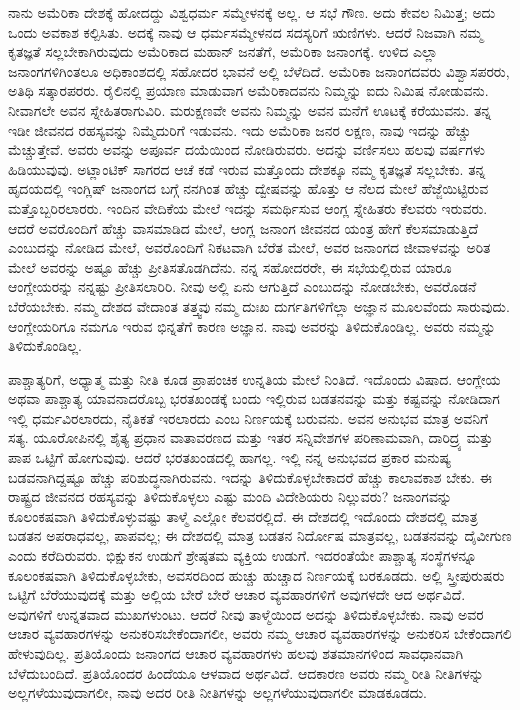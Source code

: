 ನಾನು ಅಮೆರಿಕಾ ದೇಶಕ್ಕೆ ಹೋದದ್ದು ವಿಶ್ವಧರ್ಮ ಸಮ್ಮೇಳನಕ್ಕೆ ಅಲ್ಲ. ಆ ಸಭೆ ಗೌಣ. ಅದು ಕೇವಲ ನಿಮಿತ್ತ; ಅದು ಒಂದು ಅವಕಾಶ ಕಲ್ಪಿಸಿತು. ಅದಕ್ಕೆ ನಾವು ಆ ಧರ್ಮಸಮ್ಮೇಳನದ ಸದಸ್ಯರಿಗೆ ಋಣಿಗಳು. ಆದರೆ ನಿಜವಾಗಿ ನಮ್ಮ ಕೃತಜ್ಞತೆ ಸಲ್ಲಬೇಕಾಗಿರುವುದು ಅಮೆರಿಕಾದ ಮಹಾನ್​ ಜನತೆಗೆ, ಅಮೆರಿಕಾ ಜನಾಂಗಕ್ಕೆ. ಉಳಿದ ಎಲ್ಲಾ ಜನಾಂಗಗಳಿಗಿಂತಲೂ ಅಧಿಕಾಂಶದಲ್ಲಿ ಸಹೋದರ ಭಾವನೆ ಅಲ್ಲಿ ಬೆಳೆದಿದೆ. ಅಮೆರಿಕಾ ಜನಾಂಗದವರು ವಿಶ್ವಾಸಪರರು, ಅತಿಥಿ ಸತ್ಕಾರಪರರು. ರೈಲಿನಲ್ಲಿ ಪ್ರಯಾಣ ಮಾಡುವಾಗ ಅಮೆರಿಕಾದವನು ನಿಮ್ಮನ್ನು ಐದು ನಿಮಿಷ ನೋಡುವನು. ನೀವಾಗಲೇ ಅವನ ಸ್ನೇಹಿತರಾಗುವಿರಿ. ಮರುಕ್ಷಣವೇ ಅವನು ನಿಮ್ಮನ್ನು ಅವನ ಮನೆಗೆ ಊಟಕ್ಕೆ ಕರೆಯುವನು. ತನ್ನ ಇಡೀ ಜೀವನದ ರಹಸ್ಯವನ್ನು ನಿಮ್ಮೆದುರಿಗೆ ಇಡುವನು. ಇದು ಅಮೆರಿಕಾ ಜನರ ಲಕ್ಷಣ, ನಾವು ಇದನ್ನು ಹೆಚ್ಚು ಮೆಚ್ಚುತ್ತೇವೆ. ಅವರು ಅವನ್ನು ಅಪೂರ್ವ ದಯೆಯಿಂದ ನೋಡಿರುವರು. ಅದನ್ನು ವರ್ಣಿಸಲು ಹಲವು ವರ್ಷಗಳು ಹಿಡಿಯುವುವು. ಅಟ್ಲಾಂಟಿಕ್​ ಸಾಗರದ ಆಚೆ ಕಡೆ ಇರುವ ಮತ್ತೊಂದು ದೇಶಕ್ಕೂ ನಮ್ಮ ಕೃತಜ್ಞತೆ ಸಲ್ಲಬೇಕು. ತನ್ನ ಹೃದಯದಲ್ಲಿ ಇಂಗ್ಲಿಷ್​ ಜನಾಂಗದ ಬಗ್ಗೆ ನನಗಿಂತ ಹೆಚ್ಚು ದ್ವೇಷವನ್ನು ಹೊತ್ತು ಆ ನೆಲದ ಮೇಲೆ ಹೆಜ್ಜೆಯಿಟ್ಟಿರುವ ಮತ್ತೊಬ್ಬರಿರಲಾರರು. ಇಂದಿನ ವೇದಿಕೆಯ ಮೇಲೆ ಇದನ್ನು ಸಮರ್ಥಿಸುವ ಆಂಗ್ಲ ಸ್ನೇಹಿತರು ಕೆಲವರು ಇರುವರು. ಆದರೆ ಅವರೊಂದಿಗೆ ಹೆಚ್ಚು ವಾಸಮಾಡಿದ ಮೇಲೆ, ಆಂಗ್ಲ ಜನಾಂಗ ಜೀವನದ ಯಂತ್ರ ಹೇಗೆ ಕೆಲಸಮಾಡುತ್ತಿದೆ ಎಂಬುದನ್ನು ನೋಡಿದ ಮೇಲೆ, ಅವರೊಂದಿಗೆ ನಿಕಟವಾಗಿ ಬೆರೆತ ಮೇಲೆ, ಅವರ ಜನಾಂಗದ ಜೀವಾಳವನ್ನು ಅರಿತ ಮೇಲೆ ಅವರನ್ನು ಅಷ್ಟೂ ಹೆಚ್ಚು ಪ್ರೀತಿಸತೊಡಗಿದೆನು. ನನ್ನ ಸಹೋದರರೇ, ಈ ಸಭೆಯಲ್ಲಿರುವ ಯಾರೂ ಆಂಗ್ಲೇಯರನ್ನು ನನ್ನಷ್ಟು ಪ್ರೀತಿಸಲಾರಿರಿ. ನೀವು ಅಲ್ಲಿ ಏನು ಆಗುತ್ತಿದೆ ಎಂಬುದನ್ನು ನೋಡಬೇಕು, ಅವರೊಡನೆ ಬೆರೆಯಬೇಕು. ನಮ್ಮ ದೇಶದ ವೇದಾಂತ ತತ್ತ್ವವು ನಮ್ಮ ದುಃಖ ದುರ್ಗತಿಗಳಿಗೆಲ್ಲಾ ಅಜ್ಞಾನ ಮೂಲವೆಂದು ಸಾರುವುದು. ಆಂಗ್ಲೇಯರಿಗೂ ನಮಗೂ ಇರುವ ಭಿನ್ನತೆಗೆ ಕಾರಣ ಅಜ್ಞಾನ. ನಾವು ಅವರನ್ನು ತಿಳಿದುಕೊಂಡಿಲ್ಲ. ಅವರು ನಮ್ಮನ್ನು ತಿಳಿದುಕೊಂಡಿಲ್ಲ.

ಪಾಶ್ಚಾತ್ಯರಿಗೆ, ಅಧ್ಯಾತ್ಮ ಮತ್ತು ನೀತಿ ಕೂಡ ಪ್ರಾಪಂಚಿಕ ಉನ್ನತಿಯ ಮೇಲೆ ನಿಂತಿದೆ. ಇದೊಂದು ವಿಷಾದ. ಆಂಗ್ಲೇಯ ಅಥವಾ ಪಾಶ್ಚಾತ್ಯ ಯಾವನಾದರೊಬ್ಬ ಭರತಖಂಡಕ್ಕೆ ಬಂದು ಇಲ್ಲಿರುವ ಬಡತನವನ್ನು ಮತ್ತು ಕಷ್ಟವನ್ನು ನೋಡಿದಾಗ ಇಲ್ಲಿ ಧರ್ಮವಿರಲಾರದು, ನೈತಿಕತೆ ಇರಲಾರದು ಎಂಬ ನಿರ್ಣಯಕ್ಕೆ ಬರುವನು. ಅವನ ಅನುಭವ ಮಾತ್ರ ಅವನಿಗೆ ಸತ್ಯ. ಯೂರೋಪಿನಲ್ಲಿ ಶೈತ್ಯ ಪ್ರಧಾನ ವಾತಾವರಣದ ಮತ್ತು ಇತರ ಸನ್ನಿವೇಶಗಳ ಪರಿಣಾಮವಾಗಿ, ದಾರಿದ್ರ್ಯ ಮತ್ತು ಪಾಪ ಒಟ್ಟಿಗೆ ಹೋಗುವುವು. ಆದರೆ ಭರತಖಂಡದಲ್ಲಿ ಹಾಗಲ್ಲ. ಇಲ್ಲಿ ನನ್ನ ಅನುಭವದ ಪ್ರಕಾರ ಮನುಷ್ಯ ಬಡವನಾಗಿದ್ದಷ್ಟೂ ಹೆಚ್ಚು ಪರಿಶುದ್ಧನಾಗಿರುವನು. ಇದನ್ನು ತಿಳಿದುಕೊಳ್ಳಬೇಕಾದರೆ ಹೆಚ್ಚು ಕಾಲಾವಕಾಶ ಬೇಕು. ಈ ರಾಷ್ಟ್ರದ ಜೀವನದ ರಹಸ್ಯವನ್ನು ತಿಳಿದುಕೊಳ್ಳಲು ಎಷ್ಟು ಮಂದಿ ವಿದೇಶಿಯರು ನಿಲ್ಲುವರು? ಜನಾಂಗವನ್ನು ಕೂಲಂಕಷವಾಗಿ ತಿಳಿದುಕೊಳ್ಳುವಷ್ಟು ತಾಳ್ಮೆ ಎಲ್ಲೋ ಕೆಲವರಲ್ಲಿದೆ. ಈ ದೇಶದಲ್ಲಿ ಇದೊಂದು ದೇಶದಲ್ಲಿ ಮಾತ್ರ ಬಡತನ ಅಪರಾಧವಲ್ಲ, ಪಾಪವಲ್ಲ; ಈ ದೇಶದಲ್ಲಿ ಮಾತ್ರ ಬಡತನ ನಿರ್ದೋಷ ಮಾತ್ರವಲ್ಲ, ಬಡತನವನ್ನು ದೈವೀಗುಣ ಎಂದು ಕರೆದಿರುವರು. ಭಿಕ್ಷುಕನ ಉಡುಗೆ ಶ್ರೇಷ್ಠತಮ ವ್ಯಕ್ತಿಯ ಉಡುಗೆ. ಇದರಂತೆಯೇ ಪಾಶ್ಚಾತ್ಯ ಸಂಸ್ಥೆಗಳನ್ನೂ ಕೂಲಂಕಷವಾಗಿ ತಿಳಿದುಕೊಳ್ಳಬೇಕು, ಅವಸರದಿಂದ ಹುಚ್ಚು ಹುಚ್ಚಾದ ನಿರ್ಣಯಕ್ಕೆ ಬರಕೂಡದು. ಅಲ್ಲಿ ಸ್ತ್ರೀಪುರುಷರು ಒಟ್ಟಿಗೆ ಬೆರೆಯುವುದಕ್ಕೆ ಮತ್ತು ಅಲ್ಲಿಯ ಬೇರೆ ಬೇರೆ ಆಚಾರ ವ್ಯವಹಾರಗಳಿಗೆ ಅವುಗಳದೇ ಆದ ಅರ್ಥವಿದೆ. ಅವುಗಳಿಗೆ ಉನ್ನತವಾದ ಮುಖಗಳುಂಟು. ಆದರೆ ನೀವು ತಾಳ್ಮೆಯಿಂದ ಅದನ್ನು ತಿಳಿದುಕೊಳ್ಳಬೇಕು. ನಾವು ಅವರ ಆಚಾರ ವ್ಯವಹಾರಗಳನ್ನು ಅನುಕರಿಸಬೇಕೆಂದಾಗಲೀ, ಅವರು ನಮ್ಮ ಆಚಾರ ವ್ಯವಹಾರಗಳನ್ನು ಅನುಕರಿಸ ಬೇಕೆಂದಾಗಲಿ ಹೇಳುವುದಿಲ್ಲ. ಪ್ರತಿಯೊಂದು ಜನಾಂಗದ ಆಚಾರ ವ್ಯವಹಾರಗಳು ಹಲವು ಶತಮಾನಗಳಿಂದ ಸಾವಧಾನವಾಗಿ ಬೆಳೆದುಬಂದಿದೆ. ಪ್ರತಿಯೊಂದರ ಹಿಂದೆಯೂ ಆಳವಾದ ಅರ್ಥವಿದೆ. ಆದಕಾರಣ ಅವರು ನಮ್ಮ ರೀತಿ ನೀತಿಗಳನ್ನು ಅಲ್ಲಗಳೆಯುವುದಾಗಲೀ, ನಾವು ಅದರ ರೀತಿ ನೀತಿಗಳನ್ನು ಅಲ್ಲಗಳೆಯುವುದಾಗಲೀ ಮಾಡಕೂಡದು.

